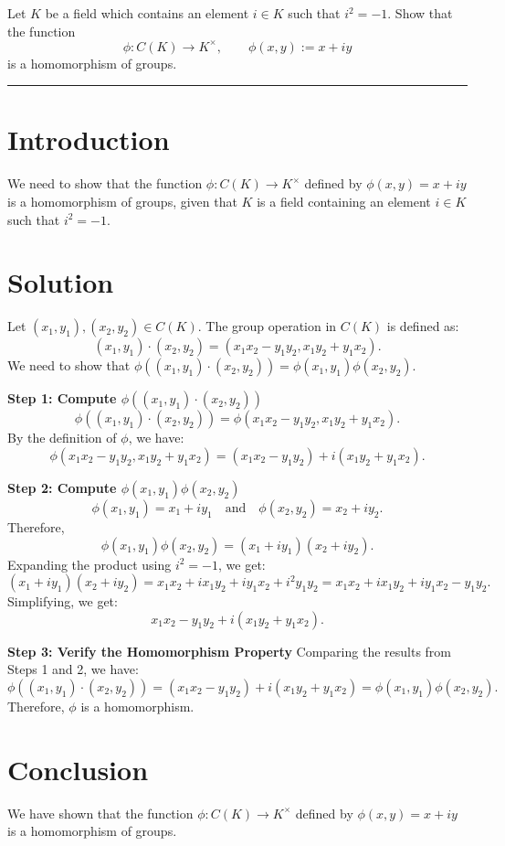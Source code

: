 \documentclass[12pt]{amsart}
\theoremstyle{definition}
\numberwithin{equation}{section}
\begin{document}
\newpage
\begin{exercise}{8} Let \(K\) be a field which contains an element \(i \in K\) such that \(i^2 = -1\). Show that the function \[\phi : C(K) \rightarrow K^{\times}, \qquad \phi(x,y) := x+iy\] is a homomorphism of groups.

    \noindent\rule{\linewidth}{1pt}

    \section*{Introduction}
    We need to show that the function \(\phi : C(K) \rightarrow K^{\times}\) defined by \(\phi(x,y) = x + iy\) is a homomorphism of groups, given that \(K\) is a field containing an element \(i \in K\) such that \(i^2 = -1\).

    \section*{Solution}
    Let \((x_1, y_1), (x_2, y_2) \in C(K)\). The group operation in \(C(K)\) is defined as:
    \[
    (x_1, y_1) \cdot (x_2, y_2) = (x_1 x_2 - y_1 y_2, x_1 y_2 + y_1 x_2).
    \]
    We need to show that \(\phi((x_1, y_1) \cdot (x_2, y_2)) = \phi(x_1, y_1) \phi(x_2, y_2)\).

    \noindent \textbf{Step 1: Compute \(\phi((x_1, y_1) \cdot (x_2, y_2))\)}
    \[
    \phi((x_1, y_1) \cdot (x_2, y_2)) = \phi(x_1 x_2 - y_1 y_2, x_1 y_2 + y_1 x_2).
    \]
    By the definition of \(\phi \), we have:
    \[
    \phi(x_1 x_2 - y_1 y_2, x_1 y_2 + y_1 x_2) = (x_1 x_2 - y_1 y_2) + i(x_1 y_2 + y_1 x_2).
    \]

    \noindent \textbf{Step 2: Compute \(\phi(x_1, y_1) \phi(x_2, y_2)\)}
    \[
    \phi(x_1, y_1) = x_1 + iy_1 \quad \text{and} \quad \phi(x_2, y_2) = x_2 + iy_2.
    \]
    Therefore,
    \[
    \phi(x_1, y_1) \phi(x_2, y_2) = (x_1 + iy_1)(x_2 + iy_2).
    \]
    Expanding the product using \(i^2 = -1\), we get:
    \[
    (x_1 + iy_1)(x_2 + iy_2) = x_1 x_2 + ix_1 y_2 + iy_1 x_2 + i^2 y_1 y_2 = x_1 x_2 + ix_1 y_2 + iy_1 x_2 - y_1 y_2.
    \]
    Simplifying, we get:
    \[
    x_1 x_2 - y_1 y_2 + i(x_1 y_2 + y_1 x_2).
    \]

    \noindent \textbf{Step 3: Verify the Homomorphism Property}
    Comparing the results from Steps 1 and 2, we have:
    \[
    \phi((x_1, y_1) \cdot (x_2, y_2)) = (x_1 x_2 - y_1 y_2) + i(x_1 y_2 + y_1 x_2) = \phi(x_1, y_1) \phi(x_2, y_2).
    \]
    Therefore, \(\phi \) is a homomorphism.

    \section*{Conclusion}
    We have shown that the function \(\phi : C(K) \rightarrow K^{\times}\) defined by \(\phi(x,y) = x + iy\) is a homomorphism of groups.

\end{exercise}
\end{document}
